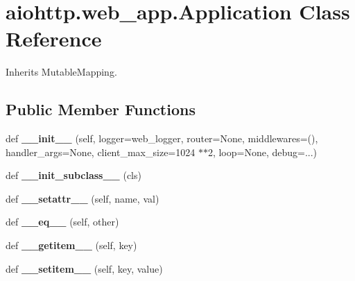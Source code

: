 \hypertarget{classaiohttp_1_1web__app_1_1_application}{}\section{aiohttp.\+web\+\_\+app.\+Application Class Reference}
\label{classaiohttp_1_1web__app_1_1_application}


Inherits Mutable\+Mapping.

\subsection*{Public Member Functions}
\begin{DoxyCompactItemize}
\item 
\mbox{\label{classaiohttp_1_1web__app_1_1_application_a85a0fdc8bb4720c40fb1fe9f753e7819}} 
def {\bfseries \+\_\+\+\_\+init\+\_\+\+\_\+} (self, logger=web\+\_\+logger, router=None, middlewares=(), handler\+\_\+args=None, client\+\_\+max\+\_\+size=1024 $\ast$$\ast$2, loop=None, debug=...)
\item 
\mbox{\label{classaiohttp_1_1web__app_1_1_application_a216ed3fd215783ed10cf0bd2ed6a7b4e}} 
def {\bfseries \+\_\+\+\_\+init\+\_\+subclass\+\_\+\+\_\+} (cls)
\item 
\mbox{\label{classaiohttp_1_1web__app_1_1_application_a69753839dc95b6ff2c561b42a5ca44c4}} 
def {\bfseries \+\_\+\+\_\+setattr\+\_\+\+\_\+} (self, name, val)
\item 
\mbox{\label{classaiohttp_1_1web__app_1_1_application_a7d26149c9ac5d5fc6438f13769d30416}} 
def {\bfseries \+\_\+\+\_\+eq\+\_\+\+\_\+} (self, other)
\item 
\mbox{\label{classaiohttp_1_1web__app_1_1_application_a2256c75ff7bbbe53b6e9f1b00b06fc9d}} 
def {\bfseries \+\_\+\+\_\+getitem\+\_\+\+\_\+} (self, key)
\item 
\mbox{\label{classaiohttp_1_1web__app_1_1_application_a233a91ba25a8496b145393c120653cf7}} 
def {\bfseries \+\_\+\+\_\+setitem\+\_\+\+\_\+} (self, key, value)
$$
\end{DoxyCompactItemize}
